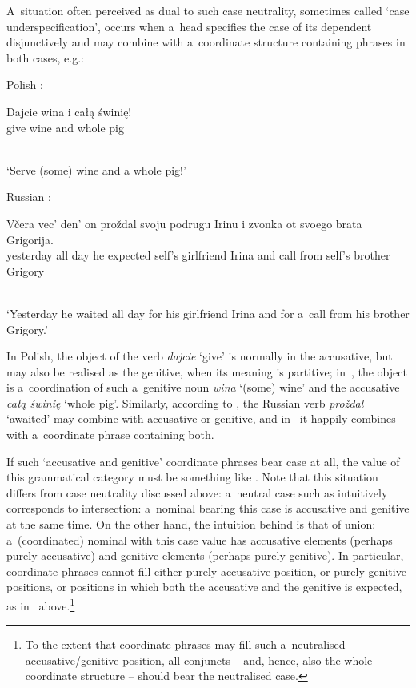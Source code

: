 \documentclass[output=paper]{langsci/langscibook}
\begin{document}
A~situation often perceived as dual to such case neutrality, sometimes called ‘case underspecification’, occurs when a~head specifies the case of its dependent disjunctively and may combine with a~coordinate structure containing phrases in both cases, e.g.:
\begin{examples}
\item\label{ex:dis:pl} Polish \citep[175]{Prze99b}: \\ [1ex]
  \begin{gloss}
    Dajcie wina i całą świnię! \\
    give wine\Gen{} and whole\Acc{} pig\Acc{}
  \end{gloss}\\[\glosslen]
  ‘Serve (some) wine and a whole pig!’
\item\label{ex:dis:ru} Russian \citep[11]{levy:01}: \\ [1ex]
  \begin{gloss}
    V{\v c}era vec' den' on pro{\v z}dal svoju podrugu Irinu i zvonka ot svoego brata Grigorija. \\
    yesterday all day he expected self's\Acc{} girlfriend\Acc{} Irina\Acc{} and call\Gen{} from self's brother Grigory
  \end{gloss}\\[\glosslen]
  ‘Yesterday he waited all day for his girlfriend Irina and for a~call from his brother Grigory.’
\end{examples}
In Polish, the object of the verb \emph{dajcie} ‘give’ is normally in the accusative, but may also be realised as the genitive, when its meaning is partitive; in~, the object is a~coordination of such a~genitive noun \emph{wina} ‘(some) wine’ and the accusative \emph{całą świnię} ‘whole pig’.  Similarly, according to \citealt{levy:01}, the Russian verb \emph{pro{\v z}dal} ‘awaited’ may combine with accusative or genitive, and in~ it happily combines with a~coordinate phrase containing both.

If such ‘accusative and genitive’ coordinate phrases bear case at all, the value of this grammatical category must be something like .  Note that this situation differs from case neutrality discussed above: a~neutral case such as  intuitively corresponds to intersection: a~nominal bearing this case is accusative and genitive at the same time.  On the other hand, the intuition behind  is that of union: a~(coordinated) nominal with this case value has accusative elements (perhaps purely accusative) and genitive elements (perhaps purely genitive).  In particular,  coordinate phrases cannot fill either purely accusative position, or purely genitive positions, or positions in which both the accusative and the genitive is expected, as in~ above.\footnote{To the extent that coordinate phrases may fill such a~neutralised accusative/genitive position, all conjuncts – and, hence, also the whole coordinate structure – should bear the neutralised  case.}
\end{document}

